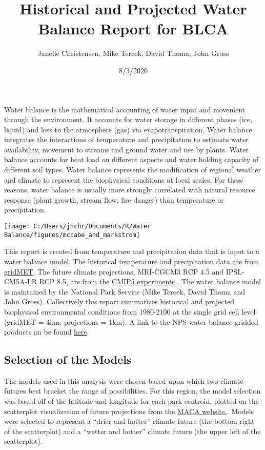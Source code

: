 \documentclass[
]{article}
\title{Historical and Projected Water Balance Report for BLCA}
\author{Janelle Christensen, Mike Tercek, David Thoma, John Gross}
\date{8/3/2020}
\begin{document}
\maketitle

Water balance is the mathematical accounting of water input and movement
through the environment. It accounts for water storage in different
phases (ice, liquid) and loss to the atmosphere (gas) via
evapotranspiration. Water balance integrates the interactions of
temperature and precipitation to estimate water availability, movement
to streams and ground water and use by plants. Water balance accounts
for heat load on different aspects and water holding capacity of
different soil types. Water balance represents the modification of
regional weather and climate to represent the biophysical conditions at
local scales. For these reasons, water balance is usually more strongly
correlated with natural resource response (plant growth, stream flow,
fire danger) than temperature or precipitation.

\begin{center}\texttt{[image: C:/Users/jnchr/Documents/R/Water Balance/figures/mccabe\_and\_markstrom]} \end{center}

This report is created from temperature and precipitation data that is
input to a water balance model. The historical temperature and
precipitation data are from
\href{http://www.climatologylab.org/gridmet.html}{gridMET}. The future
climate projections, MRI-CGCM3 RCP 4.5 and IPSL-CM5A-LR RCP 8.5, are
from the \href{https://www.wcrp-climate.org/wgcm-cmip/wgcm-cmip5}{CMIP5
experiments} . The water balance model is maintained by the National
Park Service (Mike Tercek, David Thoma and John Gross). Collectively
this report summarizes historical and projected biophysical
environmental conditions from 1980-2100 at the single grid cell level
(gridMET = 4km; projections = 1km). A link to the NPS water balance
gridded products an be found
\href{http://www.yellowstone.solutions/thredds/catalog.html}{here}.

\hypertarget{selection-of-the-models}{%
\subsection{Selection of the Models}\label{selection-of-the-models}}

The models used in this analysis were chosen based upon which two
climate futures best bracket the range of possibilities. For this
region, the model selection was based off of the latitude and longitude
for each park centroid, plotted on the scatterplot visualization of
future projections from the
\href{https://climate.northwestknowledge.net/MACA/vis_scatterplot.php}{MACA
website.}. Models were selected to represent a ``drier and hotter''
climate future (the bottom right of the scatterplot) and a ``wetter and
hotter'' climate future (the upper left of the scatterplot).
\end{document}
